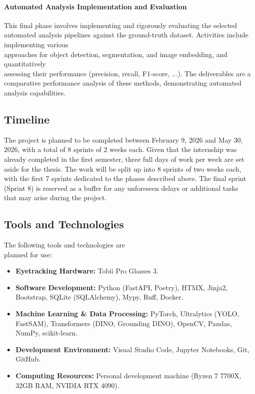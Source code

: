 \documentclass[english]{hogent-article}
\begin{document}
\paragraph{Automated Analysis Implementation and Evaluation\\}
This final phase involves implementing and rigorously evaluating the selected automated analysis pipelines 
against the ground-truth dataset.
Activities include implementing various\\ approaches for object detection, segmentation, and image embedding, and quantitatively\\
assessing their performance (precision, recall, F1-score, ...).
The deliverables are a comparative performance analysis of these methods, demonstrating automated analysis capabilities.

\subsection{Timeline}

The project is planned to be completed between February 9, 2026 and May 30, 2026, with a total of 8 sprints of 2 weeks each.
Given that the internship was already completed in the first semester, three full days of work per week are set aside for the thesis.
The work will be split up into 8 sprints of two weeks each, with the first 7 sprints dedicated to the phases described above.
The final sprint (Sprint 8) is reserved as a buffer for any unforeseen delays or additional tasks that may arise during the project.

\subsection{Tools and Technologies}

The following tools and technologies are\\ planned for use:
\begin{itemize}
    \item \textbf{Eyetracking Hardware:} Tobii Pro Glasses 3.
    \item \textbf{Software Development:} Python (FastAPI, Poetry), HTMX, Jinja2, Bootstrap, SQLite (SQLAlchemy), Mypy, Ruff, Docker.
    \item \textbf{Machine Learning \& Data Processing:} PyTorch, Ultralytics (YOLO, FastSAM), Transformers (DINO, Grounding DINO), OpenCV, Pandas, NumPy, scikit-learn.
    \item \textbf{Development Environment:} Visual Studio Code, Jupyter Notebooks, Git, GitHub. 
    \item \textbf{Computing Resources:} Personal development machine (Ryzen 7 7700X, 32GB RAM, NVIDIA RTX 4090).
\end{itemize}
\end{document}
